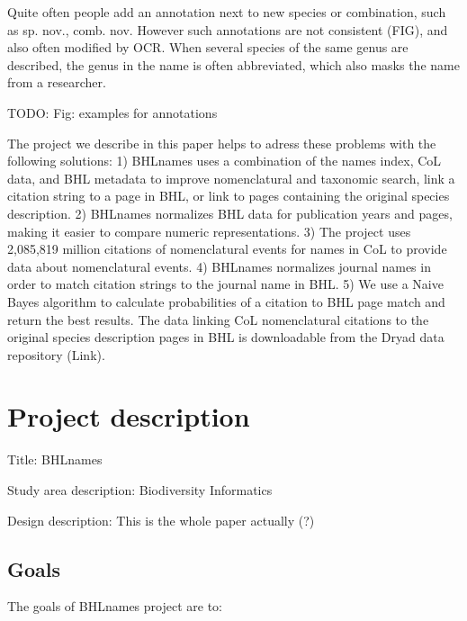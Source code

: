 \documentclass[
]{article}
\begin{document}
Quite often people add an annotation next to new species or combination,
such as sp. nov., comb. nov. However such annotations are not consistent
(FIG), and also often modified by OCR. When several species of the same
genus are described, the genus in the name is often abbreviated, which
also masks the name from a researcher.

TODO: Fig: examples for annotations

The project we describe in this paper helps to adress these problems
with the following solutions: 1) BHLnames uses a combination of the
names index, CoL data, and BHL metadata to improve nomenclatural and
taxonomic search, link a citation string to a page in BHL, or link to
pages containing the original species description. 2) BHLnames
normalizes BHL data for publication years and pages, making it easier to
compare numeric representations. 3) The project uses 2,085,819 million
citations of nomenclatural events for names in CoL to provide data about
nomenclatural events. 4) BHLnames normalizes journal names in order to
match citation strings to the journal name in BHL. 5) We use a Naive
Bayes algorithm to calculate probabilities of a citation to BHL page
match and return the best results. The data linking CoL nomenclatural
citations to the original species description pages in BHL is
downloadable from the Dryad data repository (Link).

\hypertarget{project-description}{%
\section{Project description}\label{project-description}}

Title: BHLnames

Study area description: Biodiversity Informatics

Design description: This is the whole paper actually (?)

\hypertarget{goals}{%
\subsection{Goals}\label{goals}}

The goals of BHLnames project are to:
\end{document}
